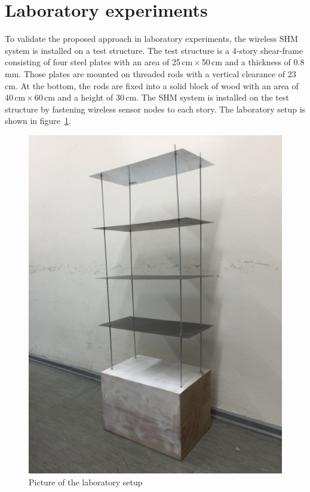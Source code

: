 \documentclass[12pt,a4paper]{scrartcl}
\begin{document}
\newpage
\section*{Laboratory experiments}


To validate the proposed approach in laboratory experiments, the wireless SHM system is installed on a test structure.
The test structure is a 4-story shear-frame consisting of four steel plates with an area of 25\,cm\,$\times$\,50\,cm and a thickness of 0.8\,mm.
Those plates are mounted on threaded rods with a vertical clearance of 23\,cm.
At the bottom, the rods are fixed into a solid block of wood with an area of 40\,cm\,$\times$\,60\,cm and a height of 30\,cm.
The SHM system is installed on the test structure by fastening wireless sensor nodes to each story.
The laboratory setup is shown in figure~\ref{fig:teststructure}.

\begin{figure}[h!]
    \centering
    \includegraphics[scale=0.3]{figures/teststructure.jpg}
    \caption{Picture of the laboratory setup}
    \label{fig:teststructure}
\end{figure}
\end{document}
